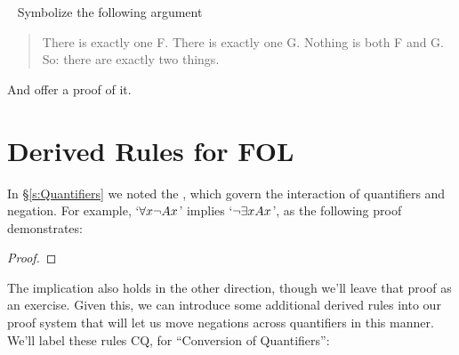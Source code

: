 \
\problempart
Symbolize the following argument
	\begin{quote}
		There is exactly one F. There is exactly one G. Nothing is both F and G. So: there are exactly two things.%
	\end{quote}
And offer a proof of it.





\section{Derived Rules for FOL}\label{s:FOLDerivedRules}


 
In \S\ref{s:Quantifiers} we noted the , which govern the interaction of quantifiers and negation.  For example, `$\forall x\neg Ax$' implies `$\neg \exists xAx$', as the following proof demonstrates:

\begin{proof}
	\open
		\open
			 
		\close
	\close
\end{proof}

The implication also holds in the other direction, though we'll leave that proof as an exercise.  Given this, we can introduce some additional derived rules into our proof system that will let us move negations across quantifiers in this manner.  We'll label these rules CQ, for ``Conversion of Quantifiers'':



